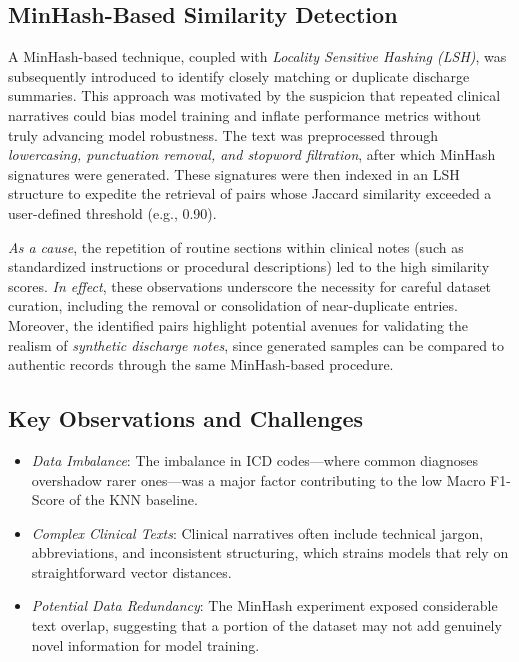 \subsection{MinHash-Based Similarity Detection}\label{sec:p1:minhash}
A MinHash-based technique, coupled with \emph{Locality Sensitive Hashing (LSH)}, was subsequently introduced to identify closely matching or duplicate discharge summaries. This approach was motivated by the suspicion that repeated clinical narratives could bias model training and inflate performance metrics without truly advancing model robustness. The text was preprocessed through \emph{lowercasing, punctuation removal, and stopword filtration}, after which MinHash signatures were generated. These signatures were then indexed in an LSH structure to expedite the retrieval of pairs whose Jaccard similarity exceeded a user-defined threshold (e.g., 0.90).

\emph{As a cause}, the repetition of routine sections within clinical notes (such as standardized instructions or procedural descriptions) led to the high similarity scores. \emph{In effect}, these observations underscore the necessity for careful dataset curation, including the removal or consolidation of near-duplicate entries. Moreover, the identified pairs highlight potential avenues for validating the realism of \emph{synthetic discharge notes}, since generated samples can be compared to authentic records through the same MinHash-based procedure.

\subsection{Key Observations and Challenges}\label{sec:p1:key_observations}
\begin{itemize}
    \item \emph{Data Imbalance}:
    The imbalance in ICD codes---where common diagnoses overshadow rarer ones---was a major factor contributing to the low Macro F1-Score of the KNN baseline.
    \item \emph{Complex Clinical Texts}:
    Clinical narratives often include technical jargon, abbreviations, and inconsistent structuring, which strains models that rely on straightforward vector distances.
    \item \emph{Potential Data Redundancy}:
    The MinHash experiment exposed considerable text overlap, suggesting that a portion of the dataset may not add genuinely novel information for model training.
\end{itemize}

